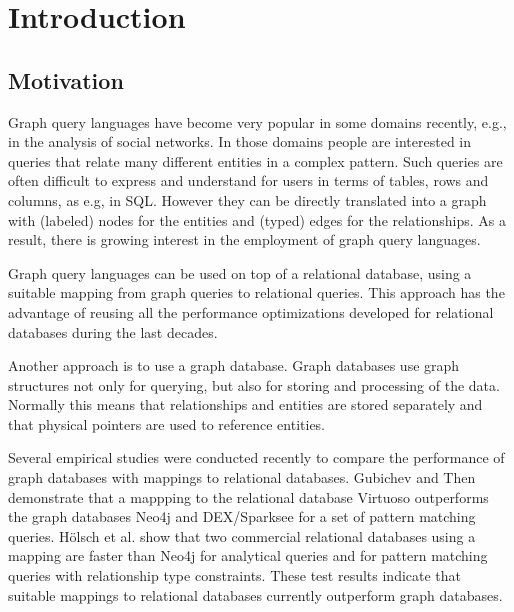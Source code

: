 \chapter{Introduction}
\label{chap:intro}

\section{Motivation}

Graph query languages have become very popular in some domains recently, e.g.,
in the analysis of social networks.
In those domains people are interested in queries that relate many different
entities in a complex pattern.
Such queries are often difficult to express and understand for users in terms
of tables, rows and columns, as e.g, in SQL. However they can be directly
translated into a graph with (labeled) nodes for the entities and (typed) edges
for the relationships. As a result, there is growing interest in the employment
of graph query languages.

Graph query languages can be used on top of a relational database, using a
suitable mapping from graph queries to relational queries.
This approach has the advantage of reusing all the performance optimizations
developed for relational databases during the last decades.

Another approach is to use a graph database. Graph databases use graph
structures not only for querying, but also for storing and processing of the
data. Normally this means that relationships and entities are stored separately
and that physical pointers are used to reference entities.

Several empirical studies were conducted recently to compare the performance
of graph databases with mappings to relational databases.
Gubichev and Then\cite{gubichev_graph_2014} demonstrate that a mappping to the
relational database Virtuoso outperforms the graph databases Neo4j and
DEX/Sparksee for a set of pattern matching queries.
Hölsch et al.\cite{holsch_performance_2017} show that two commercial
relational databases using a mapping are faster than Neo4j for analytical
queries and for pattern matching queries with relationship type constraints.
These test results indicate that suitable mappings to
relational databases currently outperform graph databases.

